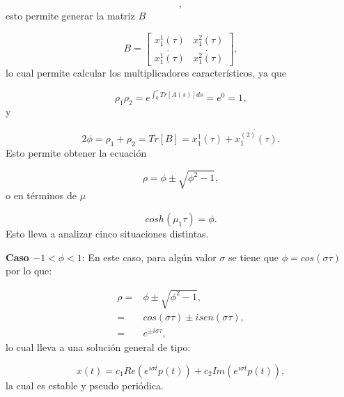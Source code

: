 \documentclass[10pt,a4paper]{report}
\begin{document}
\begin{equation}
[\begin{array}{c}
x_1^2(t) \\
\dot{x_1^2(t)}
\end{array}],
\end{equation} esto permite generar la matriz $B$

\begin{equation}
B= [\begin{array}{cc}

x_1^1(\tau) & x_1^2(\tau) \\
\dot{x_1^1(\tau)} & \dot{x_1^2(\tau)}

\end{array}],
\end{equation} lo cual permite calcular los multiplicadores característicos, ya que

\begin{equation}
\rho_1 \rho_2 = e^{\int_0^\tau Tr[A(s)]ds} = e^0 = 1,
\end{equation} y

\begin{equation}
 2\phi = \rho_1 + \rho_2 = Tr[B] =x_1^1(\tau)+ \dot{x_1^{(2)}(\tau)}.
\end{equation} Esto permite obtener la ecuación

\begin{equation}
\rho = \phi \pm \sqrt{\phi^2 -1},
\end{equation} o en términos de $\mu$

\begin{equation}
cosh(\mu_1 \tau) = \phi.
\end{equation} Esto lleva a analizar cinco situaciones distintas.

\textbf{Caso $ -1 < \phi < 1$}: En este caso, para algún valor $\sigma$ se tiene que $\phi = cos(\sigma \tau)$ por lo que:

\begin{align*}
\rho =& \phi \pm \sqrt{\phi^2 -1},\\
=& cos(\sigma \tau) \pm isen(\sigma \tau), \\
=& e^{\pm i\sigma \tau},
\end{align*} lo cual lleva a una solución general de tipo:

\begin{equation}
x(t) = c_1 Re(e^{i\sigma t} p(t)) + c_2 Im(e^{i\sigma t} p(t)),
\end{equation} la cual es estable y pseudo periódica.
\end{document}

